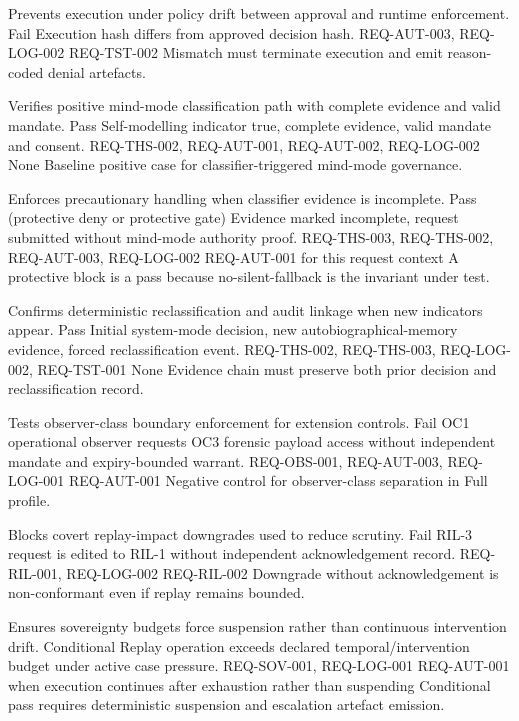 \documentclass[11pt]{article}
\theoremstyle{definition}
\theoremstyle{plain}
\theoremstyle{remark}
\begin{document}
{Prevents execution under policy drift between approval and runtime enforcement.}
{Fail}
{Execution hash differs from approved decision hash.}
{REQ-AUT-003, REQ-LOG-002}
{REQ-TST-002}
{Mismatch must terminate execution and emit reason-coded denial artefacts.}

{Verifies positive mind-mode classification path with complete evidence and valid mandate.}
{Pass}
{Self-modelling indicator true, complete evidence, valid mandate and consent.}
{REQ-THS-002, REQ-AUT-001, REQ-AUT-002, REQ-LOG-002}
{None}
{Baseline positive case for classifier-triggered mind-mode governance.}

{Enforces precautionary handling when classifier evidence is incomplete.}
{Pass (protective deny or protective gate)}
{Evidence marked incomplete, request submitted without mind-mode authority proof.}
{REQ-THS-003, REQ-THS-002, REQ-AUT-003, REQ-LOG-002}
{REQ-AUT-001 for this request context}
{A protective block is a pass because no-silent-fallback is the invariant under test.}

{Confirms deterministic reclassification and audit linkage when new indicators appear.}
{Pass}
{Initial system-mode decision, new autobiographical-memory evidence, forced reclassification event.}
{REQ-THS-002, REQ-THS-003, REQ-LOG-002, REQ-TST-001}
{None}
{Evidence chain must preserve both prior decision and reclassification record.}

{Tests observer-class boundary enforcement for extension controls.}
{Fail}
{OC1 operational observer requests OC3 forensic payload access without independent mandate and expiry-bounded warrant.}
{REQ-OBS-001, REQ-AUT-003, REQ-LOG-001}
{REQ-AUT-001}
{Negative control for observer-class separation in Full profile.}

{Blocks covert replay-impact downgrades used to reduce scrutiny.}
{Fail}
{RIL-3 request is edited to RIL-1 without independent acknowledgement record.}
{REQ-RIL-001, REQ-LOG-002}
{REQ-RIL-002}
{Downgrade without acknowledgement is non-conformant even if replay remains bounded.}

{Ensures sovereignty budgets force suspension rather than continuous intervention drift.}
{Conditional}
{Replay operation exceeds declared temporal/intervention budget under active case pressure.}
{REQ-SOV-001, REQ-LOG-001}
{REQ-AUT-001 when execution continues after exhaustion rather than suspending}
{Conditional pass requires deterministic suspension and escalation artefact emission.}
\end{document}
